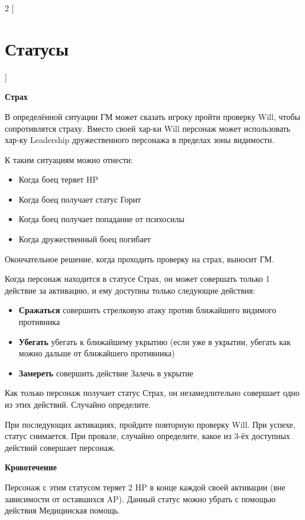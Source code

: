 \begin{multicols}{2}
    [
    \section{Статусы}
    ]    

    \textbf{Страх}

    В определённой ситуации ГМ может сказать игроку пройти проверку Will, чтобы сопротивлятся страху. Вместо своей хар-ки Will персонаж может использовать хар-ку Leadership 
    дружественного персонажа в пределах зоны видимости.

    К таким ситуациям можно отнести:

    \begin{itemize}
        \item Когда боец теряет HP
        \item Когда боец получает статус Горит
        \item Когда боец получает попадание от психосилы
        \item Когда дружественный боец погибает
    \end{itemize}

    Окончательное решение, когда проходить проверку на страх, выносит ГМ.

    Когда персонаж находится в статусе Страх, он может совершать только 1 действие за активацию, и ему доступны только следующие действия:

    \begin{itemize}
        \item \textbf{Сражаться} совершить стрелковую атаку против ближайшего видимого противника
        \item \textbf{Убегать} убегать к ближайшему укрытию (если уже в укрытии, убегать как можно дальше от ближайшего противника)
        \item \textbf{Замереть} совершить действие Залечь в укрытие
    \end{itemize}

    Как только персонаж получает статус Страх, он незамедлительно совершает одно из этих действий. Случайно определите.

    При последующих активациях, пройдите повторную проверку Will. При успехе, статус снимается. При провале, случайно определите, какое из 3-ёх доступных действий совершает персонаж.

    \textbf{Кровотечение}

    Персонаж с этим статусом теряет 2 HP в конце каждой своей активации (вне зависимости от оставшихся AP). Данный статус можно убрать с помощью действия Медицинская помощь.


\end{multicols}
